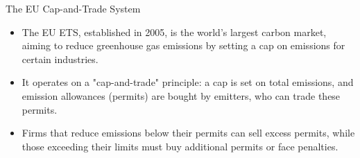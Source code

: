\documentclass{beamer}
\begin{document}
\begin{frame}{The EU Cap-and-Trade System}
    \begin{itemize}\small
        \item The EU ETS, established in 2005, is the world's largest carbon market, aiming to reduce greenhouse gas emissions by setting a cap on emissions for certain industries.
        \item It operates on a "cap-and-trade" principle: a cap is set on total emissions, and emission allowances (permits) are bought by emitters, who can trade these permits.
        \item Firms that reduce emissions below their permits can sell excess permits, while those exceeding their limits must buy additional permits or face penalties.
    \end{itemize}
\end{frame}
\end{document}
